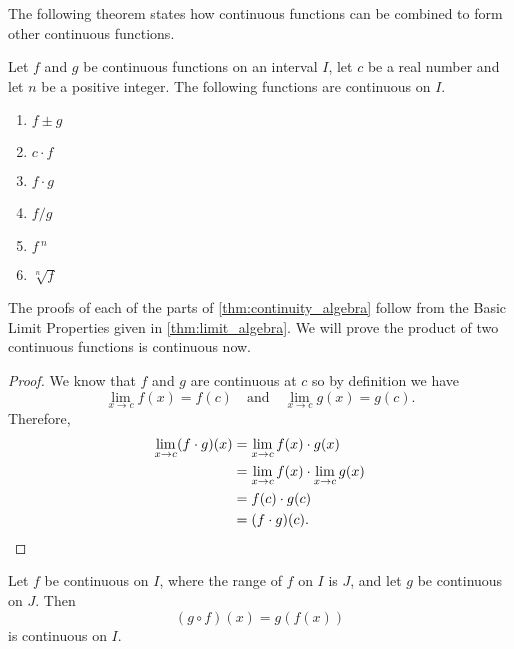 The following theorem states how continuous functions can be combined to form other continuous functions.

\begin{theorem}\label{thm:continuity_algebra}
Let $f$ and $g$ be continuous functions on an interval $I$, let $c$ be a real number and let $n$ be a positive integer. The following functions are continuous on $I$.
\begin{enumerate}
	\item	{} $f\pm g$
	\item	{} $c\cdot f$
	\item	{} $f\cdot g$
	\item	{}	$f/g$ 
	\item	{} $f\,^n$
	\item	{}	$\sqrt[n]{f}$ 
\end{enumerate}
\end{theorem}

The proofs of each of the parts of \autoref{thm:continuity_algebra} follow from the Basic Limit Properties given in \autoref{thm:limit_algebra}. We will prove the product of two continuous functions is continuous now.

\begin{proof}
We know that $f$ and $g$ are continuous at $c$ so by definition we have
\[\lim_{x\to c}f(x)=f(c) \quad \text{and} \quad \lim_{x\to c} g(x)=g(c).\]
Therefore,\vspace{-.3\baselineskip}
\begin{align*}
\lim_{x\to c} (f\cdot g)(x)&=\lim_{x\to c} f(x)\cdot g(x)\\
&=\lim_{x\to c}f(x) \cdot \lim_{x\to c} g(x)\\
&=f(c)\cdot g(c)\\
&=(f\cdot g)(c).\qedhere
\end{align*}
\end{proof}

\begin{theorem}\label{thm:composition_continuous}
Let $f$ be continuous on $I$, where the range of $f$ on $I$ is $J$, and let $g$ be continuous on $J$. Then\vspace{-.3\baselineskip}
\[(g\circ f)(x)=g(f(x))\]
is continuous on $I$.
\end{theorem}

